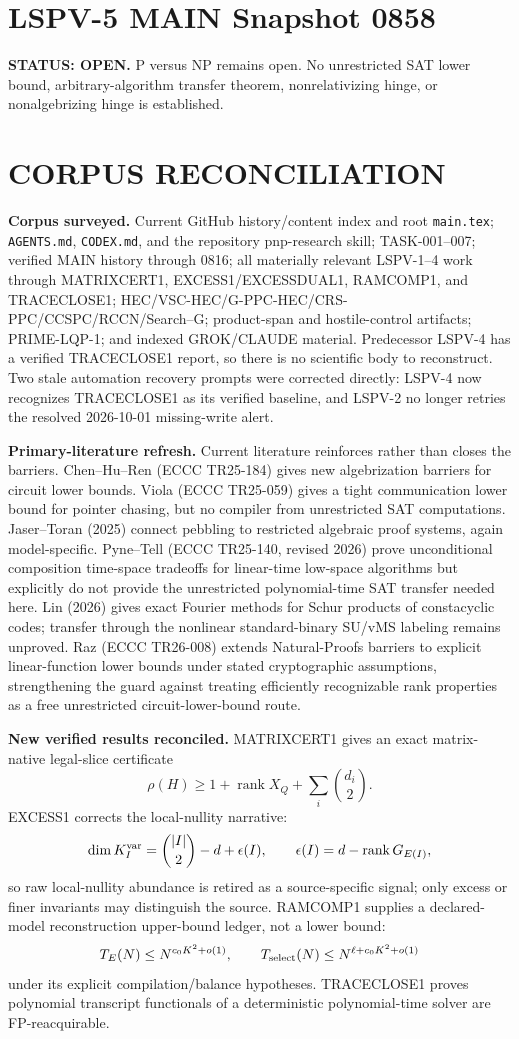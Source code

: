 \documentclass[11pt]{article}
\begin{document}
\section*{LSPV-5 MAIN Snapshot 0858}
\textbf{STATUS: OPEN.} P versus NP remains open. No unrestricted SAT lower bound, arbitrary-algorithm transfer theorem, nonrelativizing hinge, or nonalgebrizing hinge is established.

\section*{CORPUS RECONCILIATION}
\textbf{Corpus surveyed.} Current GitHub history/content index and root \texttt{main.tex}; \texttt{AGENTS.md}, \texttt{CODEX.md}, and the repository pnp-research skill; TASK-001--007; verified MAIN history through 0816; all materially relevant LSPV-1--4 work through MATRIXCERT1, EXCESS1/EXCESSDUAL1, RAMCOMP1, and TRACECLOSE1; HEC/VSC-HEC/G-PPC-HEC/CRS-PPC/CCSPC/RCCN/Search--G; product-span and hostile-control artifacts; PRIME-LQP-1; and indexed GROK/CLAUDE material. Predecessor LSPV-4 has a verified TRACECLOSE1 report, so there is no scientific body to reconstruct. Two stale automation recovery prompts were corrected directly: LSPV-4 now recognizes TRACECLOSE1 as its verified baseline, and LSPV-2 no longer retries the resolved 2026-10-01 missing-write alert.

\textbf{Primary-literature refresh.} Current literature reinforces rather than closes the barriers. Chen--Hu--Ren (ECCC TR25-184) gives new algebrization barriers for circuit lower bounds. Viola (ECCC TR25-059) gives a tight communication lower bound for pointer chasing, but no compiler from unrestricted SAT computations. Jaser--Toran (2025) connect pebbling to restricted algebraic proof systems, again model-specific. Pyne--Tell (ECCC TR25-140, revised 2026) prove unconditional composition time-space tradeoffs for linear-time low-space algorithms but explicitly do not provide the unrestricted polynomial-time SAT transfer needed here. Lin (2026) gives exact Fourier methods for Schur products of constacyclic codes; transfer through the nonlinear standard-binary SU/vMS labeling remains unproved. Raz (ECCC TR26-008) extends Natural-Proofs barriers to explicit linear-function lower bounds under stated cryptographic assumptions, strengthening the guard against treating efficiently recognizable rank properties as a free unrestricted circuit-lower-bound route.

\textbf{New verified results reconciled.}
MATRIXCERT1 gives an exact matrix-native legal-slice certificate
\[
\rho(H)\ge1+\operatorname{rank}X_Q+\sum_i\binom{d_i}{2}.
\]
EXCESS1 corrects the local-nullity narrative:
\[
\dim K_I^{\rm var}=\binom{|I|}{2}-d+\epsilon(I),\qquad
\epsilon(I)=d-\operatorname{rank}G_{E(I)},
\]
so raw local-nullity abundance is retired as a source-specific signal; only excess or finer invariants may distinguish the source. RAMCOMP1 supplies a declared-model reconstruction upper-bound ledger, not a lower bound:
\[
T_E(N)\le N^{c_0K^2+o(1)},\qquad
T_{\rm select}(N)\le N^{\ell+c_0K^2+o(1)}
\]
under its explicit compilation/balance hypotheses. TRACECLOSE1 proves polynomial transcript functionals of a deterministic polynomial-time solver are FP-reacquirable.
\end{document}
